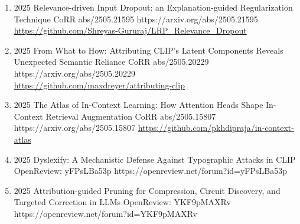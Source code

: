 {\begin{enumerate}
    
        \item {}
                        {2025}
                        {Relevance-driven Input Dropout: an Explanation-guided Regularization Technique}
                        {CoRR abs/2505.21595}
                        {https://arxiv.org/abs/2505.21595}
                        {
                            \\\href{https://github.com/Shreyas-Gururaj/LRP_Relevance_Dropout}{https://github.com/Shreyas-Gururaj/LRP\_Relevance\_Dropout}
                        }
                        
        \item {}
                        {2025}
                        {From What to How: Attributing CLIP's Latent Components Reveals Unexpected Semantic Reliance}
                        {CoRR abs/2505.20229}
                        {https://arxiv.org/abs/2505.20229}
                        {
                            \\\href{https://github.com/maxdreyer/attributing-clip}{https://github.com/maxdreyer/attributing-clip}
                        }
             
             
        \item {}
                        {2025}
                        {The Atlas of In-Context Learning: How Attention Heads Shape In-Context Retrieval Augmentation}
                        {CoRR abs/2505.15807}
                        {https://arxiv.org/abs/2505.15807}
                        {
                            \href{https://github.com/pkhdipraja/in-context-atlas}{https://github.com/pkhdipraja/in-context-atlas}
                        }
                        
                        
        \item {}
                        {2025}
                        {Dyslexify: A Mechanistic Defense Against Typographic Attacks in CLIP}
                        {OpenReview: yFPsLBa53p}
                        {https://openreview.net/forum?id=yFPsLBa53p}   
                        
                        
                        
        \item {}
                        {2025}
                        {Attribution-guided Pruning for Compression, Circuit Discovery, and Targeted Correction in LLMs}
                        {OpenReview: YKF9pMAXRv}
                        {https://openreview.net/forum?id=YKF9pMAXRv}    
                        

\end{enumerate}}
